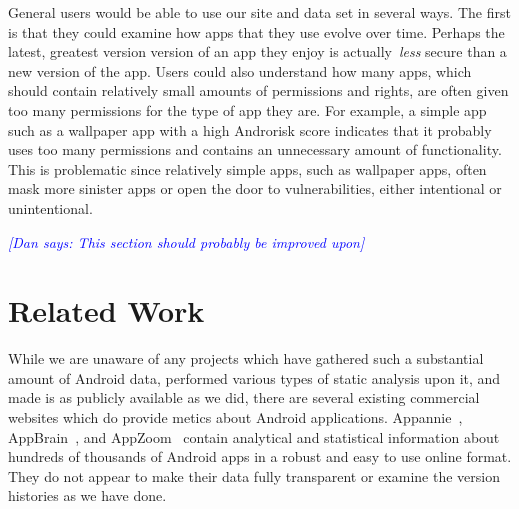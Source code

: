\documentclass[journal,transmag]{IEEEtran}
\newcommand{\todo}[1]{\textcolor{cyan}{\textbf{[#1]}}}
\newcommand{\dan}[1]{\textcolor{blue}{{\it [Dan says: #1]}}}
\begin{document}
General users would be able to use our site and data set in several ways. The first is that they could examine how apps that they use evolve over time. Perhaps the latest, greatest version version of an app they enjoy is actually~\emph{less} secure than a new version of the app. Users could also understand how many apps, which should contain relatively small amounts of permissions and rights, are often given too many permissions for the type of app they are. For example, a simple app such as a wallpaper app with a high Androrisk score indicates that it probably uses too many permissions and contains an unnecessary amount of functionality. This is problematic since relatively simple apps, such as wallpaper apps, often mask more sinister apps or open the door to vulnerabilities, either intentional or unintentional.







\dan{This section should probably be improved upon}










\section{Related Work}
\label{sec: relatedwork}



While we are unaware of any projects which have gathered such a substantial amount of Android data, performed various types of static analysis upon it, and made is as publicly available as we did, there are several existing commercial websites which do provide metics about Android applications. Appannie~\cite{appAnnie_url}, AppBrain~\cite{appbrain_url}, and AppZoom~\cite{appzoom_url} contain analytical and statistical information about hundreds of thousands of Android apps in a  robust and easy to use online format. They do not appear to make their data fully transparent or examine the version histories as we have done.
\end{document}
